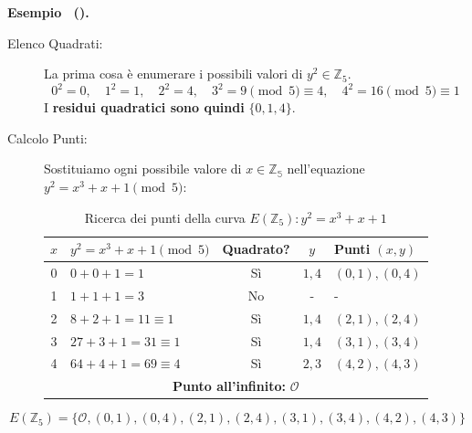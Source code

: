\documentclass[a4paper, 11pt]{article}
\newenvironment{example}[1][]{
  \par\noindent\textbf{Esempio%
  \if\relax\detokenize{#1}\relax\else\ (\textbf{#1})\fi.}\ }{}
\begin{document}
\begin{example}
    \begin{description}
        \item[Elenco Quadrati: ] La prima cosa è enumerare i possibili valori di $y^2 \in \mathbb{Z}_5$.
        \[
        0^2 = 0, \quad 1^2 = 1, \quad 2^2 = 4, \quad 3^2 = 9 \pmod 5 \equiv 4, \quad 4^2 = 16 \pmod 5 \equiv 1
        \]
        I \textbf{residui quadratici sono quindi} $\{0, 1, 4\}$.
        \item[Calcolo Punti: ] Sostituiamo ogni possibile valore di $x \in \mathbb{Z_5}$ nell'equazione $y^2 = x^3 + x + 1 \pmod 5$:
        \begin{table}[h]
        \centering
        \renewcommand{\arraystretch}{1.5}
            \begin{tabular}{|c|l|c|c|l|}
            \hline
            \textbf{$x$} & \textbf{$y^2 = x^3 + x + 1 \pmod 5$} & \textbf{Quadrato?} & \textbf{$y$} & \textbf{Punti $(x, y)$} \\ \hline
            0 & $0 + 0 + 1 = 1$ & Sì & $1, 4$ & $(0, 1), (0, 4)$ \\ \hline
            1 & $1 + 1 + 1 = 3$ & No & - & - \\ \hline
            2 & $8 + 2 + 1 = 11 \equiv 1$ & Sì & $1, 4$ & $(2, 1), (2, 4)$ \\ \hline
            3 & $27 + 3 + 1 = 31 \equiv 1$ & Sì & $1, 4$ & $(3, 1), (3, 4)$ \\ \hline
            4 & $64 + 4 + 1 = 69 \equiv 4$ & Sì & $2, 3$ & $(4, 2), (4, 3)$ \\ \hline
            \multicolumn{5}{|c|}{\textbf{Punto all'infinito:} $\mathcal{O}$} \\ \hline
            \end{tabular}
        \caption{Ricerca dei punti della curva $E(\mathbb{Z}_5): y^2 = x^3 + x + 1$}
        \end{table}
    \end{description}
    \[
        E(\mathbb{Z}_5) = \{\mathcal{O}, (0, 1), (0, 4), (2, 1), (2, 4), (3, 1), (3, 4), (4, 2), (4, 3)\}
    \]
\end{example}
\end{document}
